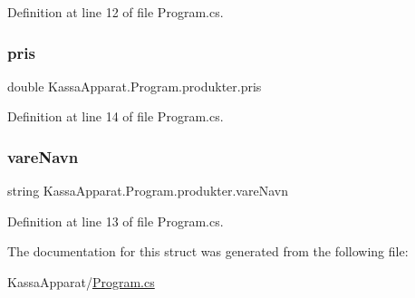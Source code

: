 Definition at line 12 of file Program.\+cs.

\mbox{\label{struct_kassa_apparat_1_1_program_1_1produkter_a52e27014a762549fe7991ae38b053d66}} 
\subsubsection{\texorpdfstring{pris}{pris}}
{\footnotesize\ttfamily double Kassa\+Apparat.\+Program.\+produkter.\+pris}



Definition at line 14 of file Program.\+cs.

\mbox{\label{struct_kassa_apparat_1_1_program_1_1produkter_a9dc9c2ffa906222a254b65ceb0c12871}} 
\subsubsection{\texorpdfstring{vare\+Navn}{vareNavn}}
{\footnotesize\ttfamily string Kassa\+Apparat.\+Program.\+produkter.\+vare\+Navn}



Definition at line 13 of file Program.\+cs.



The documentation for this struct was generated from the following file\+:\begin{DoxyCompactItemize}
\item 
Kassa\+Apparat/\mbox{\hyperlink{_program_8cs}{Program.\+cs}}\end{DoxyCompactItemize}
